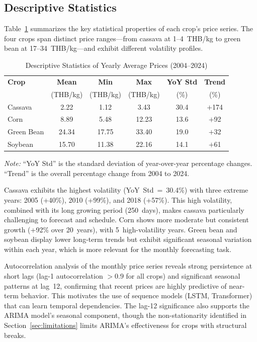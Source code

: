 \documentclass[journal]{IEEEtran}
\begin{document}
\subsection{Descriptive Statistics}

Table~\ref{tab:descriptive} summarizes the key statistical properties of each crop's price series. The four crops span distinct price ranges---from cassava at 1--4~THB/kg to green bean at 17--34~THB/kg---and exhibit different volatility profiles.

\begin{table}[htbp]
  \centering
  \caption{Descriptive Statistics of Yearly Average Prices (2004--2024)}
  \label{tab:descriptive}
  \begin{tabular}{lccccc}
    \toprule
    \textbf{Crop} & \textbf{Mean} & \textbf{Min} & \textbf{Max} & \textbf{YoY Std} & \textbf{Trend} \\
    & (THB/kg) & (THB/kg) & (THB/kg) & (\%) & (\%) \\
    \midrule
    Cassava    & 2.22 & 1.12 & 3.43 & 30.4 & $+$174 \\
    Corn       & 8.89 & 5.48 & 12.23 & 13.6 & $+$92 \\
    Green Bean & 24.34 & 17.75 & 33.40 & 19.0 & $+$32 \\
    Soybean    & 15.70 & 11.38 & 22.16 & 14.1 & $+$61 \\
    \bottomrule
  \end{tabular}
  \vspace{6pt}
  \par\raggedright\scriptsize\textit{Note:} ``YoY Std'' is the standard deviation of year-over-year percentage changes. ``Trend'' is the overall percentage change from 2004 to 2024.
\end{table}

Cassava exhibits the highest volatility (YoY~Std~=~30.4\%) with three extreme years: 2005 (+40\%), 2010 (+99\%), and 2018 (+57\%). This high volatility, combined with its long growing period (250~days), makes cassava particularly challenging to forecast and schedule. Corn shows more moderate but consistent growth (+92\% over 20~years), with 5~high-volatility years. Green bean and soybean display lower long-term trends but exhibit significant seasonal variation within each year, which is more relevant for the monthly forecasting task.

Autocorrelation analysis of the monthly price series reveals strong persistence at short lags (lag-1 autocorrelation $> 0.9$ for all crops) and significant seasonal patterns at lag~12, confirming that recent prices are highly predictive of near-term behavior. This motivates the use of sequence models (LSTM, Transformer) that can learn temporal dependencies. The lag-12 significance also supports the ARIMA model's seasonal component, though the non-stationarity identified in Section~\ref{sec:limitations} limits ARIMA's effectiveness for crops with structural breaks.
\end{document}
